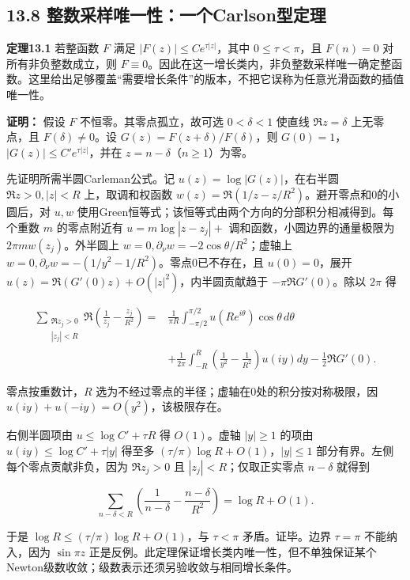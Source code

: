 \documentclass[11pt,a4paper]{article}
\begin{document}
\subsection{13.8
整数采样唯一性：一个Carlson型定理}\label{ux6574ux6570ux91c7ux6837ux552fux4e00ux6027ux4e00ux4e2acarlsonux578bux5b9aux7406}

\textbf{定理13.1} 若整函数 \(F\) 满足 \(|F(z)|\le Ce^{\tau|z|}\)，其中
\(0\le\tau<\pi\)，且 \(F(n)=0\) 对所有非负整数成立，则
\(F\equiv0\)。因此在这一增长类内，非负整数采样唯一确定整函数。这里给出足够覆盖``需要增长条件''的版本，不把它误称为任意光滑函数的插值唯一性。

\textbf{证明：} 假设 \(F\) 不恒零。其零点孤立，故可选 \(0<\delta<1\)
使直线 \(\Re z=\delta\) 上无零点，且 \(F(\delta)\ne0\)。设
\(G(z)=F(z+\delta)/F(\delta)\)，则
\(G(0)=1\)，\(|G(z)|\le C'e^{\tau|z|}\)，并在
\(z=n-\delta\)（\(n\ge1\)）为零。

先证明所需半圆Carleman公式。记 \(u(z)=\log|G(z)|\)，在右半圆
\(\Re z>0,|z|<R\) 上，取调和权函数
\(w(z)=\Re(1/z-z/R^2)\)。避开零点和0的小圆后，对 \(u,w\)
使用Green恒等式；该恒等式由两个方向的分部积分相减得到。每个重数 \(m\)
的零点附近有 \(u=m\log|z-z_j|+\) 调和函数，小圆边界的通量极限为
\(2\pi m w(z_j)\)。外半圆上
\(w=0,\partial_\nu w=-2\cos\theta/R^2\)；虚轴上
\(w=0,\partial_\nu w=-(1/y^2-1/R^2)\)。零点0已不存在，且
\(u(0)=0\)，展开 \(u(z)=\Re(G'(0)z)+O(|z|^2)\)，内半圆贡献趋于
\(-\pi\Re G'(0)\)。除以 \(2\pi\) 得

\[
\begin{aligned}
\sum_{\substack{\Re z_j>0\\|z_j|<R}}
\Re\left(\frac1{z_j}-\frac{z_j}{R^2}\right)
={}&\frac1{\pi R}\int_{-\pi/2}^{\pi/2}u(Re^{i\theta})\cos\theta\,d\theta\\
&+\frac1{2\pi}\int_{-R}^{R}\left(\frac1{y^2}-\frac1{R^2}\right)u(iy)dy
-\frac12\Re G'(0).
\end{aligned}\tag{13.14}
\]

零点按重数计，\(R\) 选为不经过零点的半径；虚轴在0处的积分按对称极限，因
\(u(iy)+u(-iy)=O(y^2)\)，该极限存在。

右侧半圆项由 \(u\le\log C'+\tau R\) 得 \(O(1)\)。虚轴 \(|y|\ge1\) 的项由
\(u(iy)\le\log C'+\tau|y|\) 得至多
\((\tau/\pi)\log R+O(1)\)，\(|y|\le1\)
部分有界。左侧每个零点贡献非负，因为 \(\Re z_j>0\) 且
\(|z_j|<R\)；仅取正实零点 \(n-\delta\) 就得到

\[
\sum_{n-\delta<R}\left(\frac1{n-\delta}-\frac{n-\delta}{R^2}\right)
=\log R+O(1).
\]

于是 \(\log R\le(\tau/\pi)\log R+O(1)\)，与 \(\tau<\pi\)
矛盾。证毕。边界 \(\tau=\pi\) 不能纳入，因为 \(\sin\pi z\)
正是反例。此定理保证增长类内唯一性，但不单独保证某个Newton级数收敛；级数表示还须另验收敛与相同增长条件。
\end{document}
